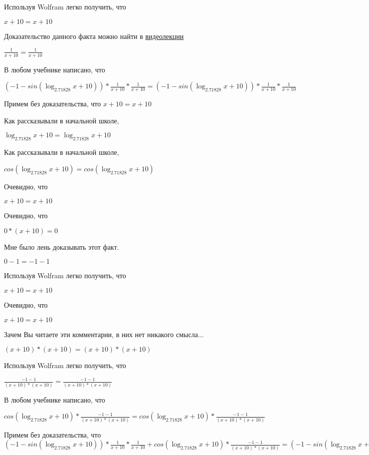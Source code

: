 \documentclass[12pt,a4paper,fleqn]{article}
\theoremstyle{definition}
\begin{document}
Используя Wolfram легко получить, что

$ x  +  10  =  x  +  10 $

Доказательство данного факта можно найти в \href{https://www.youtube.com/watch?v=dQw4w9WgXcQ}{видеолекции}

$\frac{ 1 }{ x  +  10 }
 = \frac{ 1 }{ x  +  10 }
$

В любом учебнике написано, что

$( -1  - sin(\log_{ 2.71828 }{ x  +  10 })) * \frac{ 1 }{ x  +  10 }
 * \frac{ 1 }{ x  +  10 }
 = ( -1  - sin(\log_{ 2.71828 }{ x  +  10 })) * \frac{ 1 }{ x  +  10 }
 * \frac{ 1 }{ x  +  10 }
$

Примем без доказательства, что
$ x  +  10  =  x  +  10 $

Как рассказывали в начальной школе,

$\log_{ 2.71828 }{ x  +  10 } = \log_{ 2.71828 }{ x  +  10 }$

Как рассказывали в начальной школе,

$cos(\log_{ 2.71828 }{ x  +  10 }) = cos(\log_{ 2.71828 }{ x  +  10 })$

Очевидно, что

$ x  +  10  =  x  +  10 $

Очевидно, что

$ 0  * ( x  +  10 ) =  0 $

Мне было лень доказывать этот факт.

$ 0  -  1  =  -1  -  1 $

Используя Wolfram легко получить, что

$ x  +  10  =  x  +  10 $

Очевидно, что

$ x  +  10  =  x  +  10 $

Зачем Вы читаете эти комментарии, в них нет никакого смысла...

$( x  +  10 ) * ( x  +  10 ) = ( x  +  10 ) * ( x  +  10 )$

Используя Wolfram легко получить, что

$\frac{ -1  -  1 }{( x  +  10 ) * ( x  +  10 )}
 = \frac{ -1  -  1 }{( x  +  10 ) * ( x  +  10 )}
$

В любом учебнике написано, что

$cos(\log_{ 2.71828 }{ x  +  10 }) * \frac{ -1  -  1 }{( x  +  10 ) * ( x  +  10 )}
 = cos(\log_{ 2.71828 }{ x  +  10 }) * \frac{ -1  -  1 }{( x  +  10 ) * ( x  +  10 )}
$

Примем без доказательства, что
$( -1  - sin(\log_{ 2.71828 }{ x  +  10 })) * \frac{ 1 }{ x  +  10 }
 * \frac{ 1 }{ x  +  10 }
 + cos(\log_{ 2.71828 }{ x  +  10 }) * \frac{ -1  -  1 }{( x  +  10 ) * ( x  +  10 )}
 = ( -1  - sin(\log_{ 2.71828 }{ x  +  10 })) * \frac{ 1 }{ x  +  10 }
 * \frac{ 1 }{ x  +  10 }
 + cos(\log_{ 2.71828 }{ x  +  10 }) * \frac{ -1  -  1 }{( x  +  10 ) * ( x  +  10 )}
$
\end{document}
